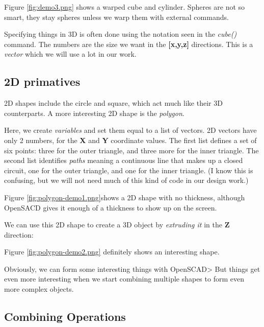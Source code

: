 
Figure \ref{fig:demo3.png} shows a warped cube and cylinder. Spheres are not so
smart, they stay spheres unless we warp them with external commands.


Specifying things in 3D is often done using the notation seen in the {\it
cube()} command. The numbers are the size we want in the {\bf [x,y,z]}
directions. This is a {\it vector} which we will use a lot in our work.

\subsection*{2D primatives}

2D shapes include the circle and square, which act much like their 3D
counterparts. A more interesting 2D shape is the {\it polygon}.


Here, we create {\it variables} and set them equal to a list of vectors. 2D
vectors have only 2 numbers, for the {\bf X} and {\bf Y} coordinate values. The
first list defines a set of six points: three for the outer triangle, and three
more for the inner triangle. The second list identifies {\it paths} meaning a
continuous line that makes up a closed circuit, one for the outer triangle, and
one for the inner triangle. (I know this is confusing, but we will not need
much of this kind of code in our design work.)


Figure \ref{fig:polygon-demo1.png}shows a  2D shape with no thickness, although
OpenSACD gives it enough of a thickness to show up on the screen.

We can use this 2D shape to create a 3D object by {\it extruding it} in the
{\bf Z} direction:


Figure \ref{fig:polygon-demo2.png} definitely shows an interesting shape.


Obviously, we can form some interesting things with OpenSCAD> But things get
even more interesting when we start combining multiple shapes to form even more
complex objects.

\subsection{Combining Operations}

